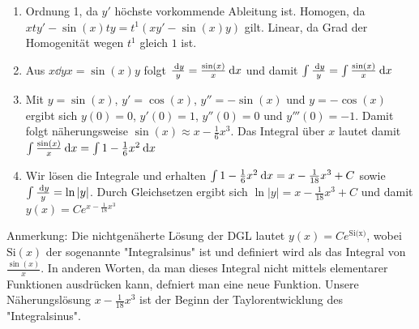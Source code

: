 \item

\begin{enumerate}
	\item Ordnung 1, da $y'$ höchste vorkommende Ableitung ist. Homogen, da $xty'-\sin(x)ty = t^1 (xy'-\sin(x)y)$ gilt. Linear, da Grad der Homogenität wegen $t^1$ gleich $1$ ist.
	\item Aus $x\dd{y}{x} = \sin(x) y$ folgt $\frac{\:\mathrm{d}{y}}{y} = \frac{\sin(x)}{x} \:\mathrm{d}{x}$ und damit $\int \frac{\:\mathrm{d}{y}}{y} = \int \frac{\sin(x)}{x} \:\mathrm{d}{x}$
	\item Mit $y=\sin(x)$, $y'=\cos(x)$, $y''=-\sin(x)$ und $y=-\cos(x)$ ergibt sich $y(0)=0$, $y'(0)=1$, $y''(0)=0$ und $y'''(0)=-1$. Damit folgt näherungsweise $\sin(x) \approx x-\frac{1}{6}x^3$. Das Integral über $x$ lautet damit $\int \frac{\sin(x)}{x} \:\mathrm{d}{x} = \int 1 - \frac{1}{6} x^2 \:\mathrm{d}{x}$
	\item Wir lösen die Integrale und erhalten $\int 1 - \frac{1}{6} x^2 \:\mathrm{d}{x} = x - \frac{1}{18}x^3 + C$ sowie $\int \frac{\:\mathrm{d}{y}}{y} = \ln|y|$. Durch Gleichsetzen ergibt sich $\ln|y|=x - \frac{1}{18}x^3 + C$ und damit $y(x) = C e^{x - \frac{1}{18}x^3}$
\end{enumerate}


Anmerkung: Die nichtgenäherte Lösung der DGL lautet $y(x) = C e^{\text{Si(x)}}$, wobei $\text{Si}(x)$ der sogenannte "Integralsinus" ist und definiert wird als das Integral von $\frac{\sin(x)}{x}$. In anderen Worten, da man dieses Integral nicht mittels elementarer Funktionen ausdrücken kann, defniert man eine neue Funktion. Unsere Näherungslösung $x - \frac{1}{18}x^3$ ist der Beginn der Taylorentwicklung des "Integralsinus".